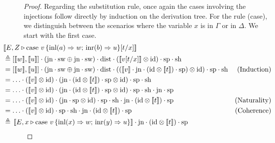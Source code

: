 \begin{proof}
Regarding the substitution rule, once again the cases involving the injections follow directly by induction on the derivation tree. For the rule (case), we distinguish between the scenarios where the variable $x$ is in $\Gamma$ or in $\Delta$. We start with the first case.
\begin{align*}
  & \hspace{-30pt} [\![E, Z \vljud \text{case } v \,  \{\text{inl} (a) \Rightarrow w ;\, \text{inr} (b) \Rightarrow u\} [t/x]]\!] \\
  & \hspace{-30pt} \triangleq \left[[\![ w ]\!] ,[\![ u ]\!]\right] \comp (\text{jn}\comp \sw \oplus \text{jn} \comp \sw) \comp \dist \comp  ([\![ v [t/x] ]\!]   \otimes \id)  \comp \text{sp} \comp \text{sh} \\
  & \hspace{-30pt} = \left[[\![ w ]\!] ,[\![ u ]\!]\right] \comp (\text{jn} \comp \sw \oplus \text{jn} \comp \sw)  \comp \dist \comp (([\![ v]\!]  \comp \text{jn} \comp (\id \otimes [\![  t ]\!] ) \comp \text{sp} )\otimes \id)  \comp \text{sp} \comp \text{sh} & {\text{(Induction)}} \\
  & \hspace{-30pt} =  \ldots  \comp ([\![ v]\!] \otimes \id) \comp (\text{jn} \comp (\id \otimes [\![  t ]\!] ) \comp \text{sp} \otimes \id)  \comp \text{sp}\comp \text{sh}\\
  & \hspace{-30pt} = \ldots \comp ([\![ v]\!] \otimes \id)  \comp (\text{jn} \comp (\id \otimes [\![  t ]\!] ) \comp \text{sp} \otimes \id)  \comp \text{sp} \comp \text{sh} \comp \text{jn} \comp \text{sp} &  \\
  & \hspace{-30pt} = \ldots  \comp ([\![ v]\!] \otimes \id) \comp (\text{jn}\comp \text{sp} \otimes   \id) \comp \text{sp}   \comp \text{sh} \comp \text{jn}\comp (\id \otimes [\![ t ]\!] ) \comp \text{sp}  & {(\text{Naturality})}   \\
  & \hspace{-30pt} = \ldots  \comp ([\![ v]\!] \otimes \id) \comp \text{sp}  \comp \text{sh}  \comp  \text{jn} \comp (\id \otimes [\![ t ]\!] ) \comp \text{sp}  & {(\text{Coherence})}   \\
  & \hspace{-30pt} \triangleq \, [\![E,  x \vljud \text{case } v\,  \{\text{inl} (x) \Rightarrow w ;\, \text{inr} (y) \Rightarrow u\}]\!]  \comp  \text{jn} \comp (\id \otimes [\![ t ]\!] ) \comp \text{sp}
\end{align*}


\end{proof}

